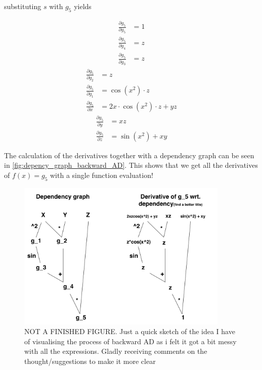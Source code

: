 substituting $s$ with $g_5$ yields
\begin{multicols}{3}
    \noindent
    \begin{align*}
        \frac{\partial g_5}{\partial g_5} &= 1\\
        \frac{\partial g_5}{\partial g_4} &= z\\
        \frac{\partial g_5}{\partial g_3} &= z
    \end{align*}
    \begin{align*}
        \frac{\partial g_5}{\partial g_2} &= z\\
        \frac{\partial g_5}{\partial g_1} &= \cos(x^2)\cdot z\\
        \frac{\partial g_5}{\partial x}   &= 2x\cdot\cos(x^2)\cdot z + yz
    \end{align*}
    \begin{align*}
        \frac{\partial g_5}{\partial y}   &= xz\\
        \frac{\partial g_5}{\partial z}   &= \sin(x^2)+xy
    \end{align*}
\end{multicols}
The calculation of the derivatives together with a dependency graph can be seen in \autoref{fig:depency_graph_backward_AD}. This shows that we get all the derivatives of $f(x) = g_5$ with a single function evaluation!
\begin{figure}[htbp]
	\centering
	    \includegraphics[width=0.9\textwidth]{figures/dependency_graph_backward_AD.pdf}
	    \caption{NOT A FINISHED FIGURE. Just a quick sketch of the idea I have of visualising the process of backward AD as i felt it got a bit messy with all the expressions. Gladly receiving comments on the thought/suggestions to make it more clear}
	\label{fig:depency_graph_backward_AD}
\end{figure}

